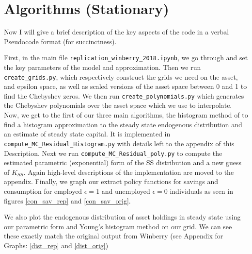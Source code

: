 \documentclass[11pt]{article}
\newcommand{\code}[1]{\texttt{#1}}
\begin{document}
\section{Algorithms (Stationary)}
Now I will give a brief description of the key aspects of the code in a verbal Pseudocode format (for succinctness). \par 
First, in the main file \code{replication\_winberry\_2018.ipynb},  we go through and set the key parameters of the model and approximation.
Then we run \code{create\_grids.py}, which respectively construct the grids we need on the asset, and epsilon space, as well as scaled versions of the asset space between 0 and 1 to find the Chebyshev zeros. We then run \code{create\_polynomials.py} which generates the Chebyshev polynomials over the asset space which we use to interpolate. 
Now, we get to the first of our three main algorithms, the histogram method of \cite{Young2010} to find a histogram approximation to the steady state endogenous distribution and an estimate of steady state capital. It is implemented in
 \code{compute\_MC\_Residual\_Histogram.py} with details left to the appendix of this Description.  Next we run \code{compute\_MC\_Residual\_poly.py} to compute the estimated parametric (exponential) form of the SS distribution and a new guess of $K_{SS}$. Again high-level descriptions of the implementation are moved to the appendix. 
Finally, we graph our extract policy functions for savings and consumption for employed $\epsilon =1$ and unemployed $\epsilon =0$ individuals as seen in figures \ref{con_sav_rep} and \ref{con_sav_orig}.\par  We also plot the endogenous distribution of asset holdings in steady state using our parametric form  and Young's histogram method on our grid. We can see these exactly match the original output from Winberry (see Appendix for Graphs: \ref{dist_rep} and \ref{dist_orig})
\end{document}
